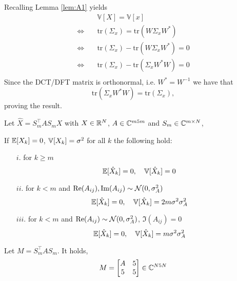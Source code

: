     Recalling Lemma \ref{lem:A1} yields
    \[
        \begin{aligned}
                                  & \mathbb V[X] = \mathbb{V}[x]\\
            \Leftrightarrow \quad & \text{tr}(\Sigma_x) =  \text{tr}(W\Sigma_x W^*)\\
            \Leftrightarrow \quad & \text{tr}(\Sigma_x) -  \text{tr}(W\Sigma_x W^*) = 0\\
            \Leftrightarrow \quad & \text{tr}(\Sigma_x) -  \text{tr}(\Sigma_x W^*W) = 0\\
        \end{aligned}
    \]
    Since the DCT/DFT matrix is orthonormal, i.e. $W^* = W^{-1}$ we have that 
    \[
        \text{tr}(\Sigma_x W^*W) = \text{tr}(\Sigma_x),
    \]
    proving the result.
\endproof
%
\begin{lemma} \label{lem:A3} Let $\hat X = S^\top_m A S_m X$ with $X\in\mathbb{R}^N$, $A\in\mathbb{C}^{m5 m}$ and $S_m\in\mathbb{C}^{m\times N}$,




If $\mathbb{E}[X_k] = 0$, $\mathbb{V}[X_k] = \sigma^2$ for all $k$ the following hold:
%
\begin{itemize}
    \item[$i.$] for $k\geq m$
    \[
        \mathbb{E}[\hat X_k] = 0,\quad
        \mathbb{V}[\hat X_k] = 0
    \]
    \item[$ii.$] for $k<m$ and $\Re(A_{ij}),\Im(A_{ij})\sim \mathcal{N}(0, \sigma_A^2)$
    \[
        \mathbb{E}[\hat X_k] = 0,\quad
        \mathbb{V}[\hat X_k] = 2 m \sigma^2 \sigma_A^2
    \]
    \item[$iii.$] for $k<m$ and $\Re(A_{ij})\sim \mathcal{N}(0, \sigma_A^2)$, $\Im(A_{ij})=0$
    \[
        \mathbb{E}[\hat X_k] = 0,\quad
        \mathbb{V}[\hat X_k] = m \sigma^2 \sigma_A^2
    \]
\end{itemize}
%
\end{lemma}
%
\proof
    Let $M = S_m^\top A S_m$. It holds,
    \[
        M = 
            \begin{bmatrix}
                A & 5\\
                5 & 5
            \end{bmatrix}\in\mathbb{C}^{N5 N}
    \]

